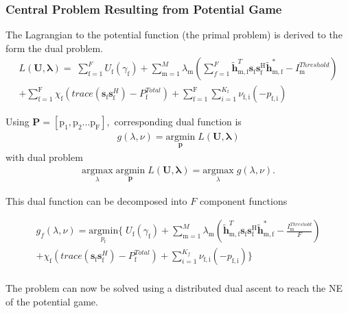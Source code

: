\documentclass[12pt,a4paper]{report}
\begin{document}
\subsubsection{Central Problem Resulting from Potential Game}
The Lagrangian to the potential function (the primal problem) is derived to the form the dual problem. 
\begin{multline}
L(\mathbf{U,\lambda}) = 
\;
\sum_{\text{f}=1}^F U_{\text{f}}(\gamma_{\text{f}}) 
+
\sum_{\mathrm{m=1}}^M \lambda_{\mathrm{m}}
(	  \sum^F_{f=1} \mathbf{\tilde{h}}_{\mathrm{m,f}}^T  \mathbf{s}_{\mathrm{f}} 						
	\mathbf{s_{\mathrm{f}}^{\mathrm{H}}} \mathbf{\tilde{h}_{\mathrm{m,f}}^*} - I^{Threshold}		
	_{\mathrm{m}} )
\\
+ 
\sum_{\text{f}=1}^\text{F}
\chi_{\mathrm{f}}(trace(\mathbf{s}_\mathrm{f}\mathbf{s}_\mathrm{f}^H)-P^{Total}_{\text{f}} )
+
\sum_{\text{f}=1}^\text{F}
\sum_{i=1}^{K_{\text{f}}}
\nu_{\mathrm{f,i}}(-p_{\mathrm{f,i}})
\end{multline}

Using $\mathbf{P}= [\mathrm{p}_1, \mathrm{p}_2...\mathrm{p}_{\text{F}}],$ corresponding dual function is
\begin{gather*}
g(\lambda,\nu) = \underset{\mathbf{p}}{\mathrm{argmin}}\;L(\mathbf{U,\lambda})
\end{gather*}
with dual problem 
\begin{gather*}
\underset{\lambda}{\mathrm{argmax}}\;\underset{\mathbf{p}}{\mathrm{argmin}}\;L(\mathbf{U,\lambda}) = \underset{\lambda}{\mathrm{argmax}}\;g(\lambda,\nu).
\end{gather*}

This dual function can be decomposed into $F$ component functions


\begin{multline}
g_f(\lambda,\nu) = \underset{p_{\text{f}}}{\mathrm{argmin}}
\{
\;
U_{\text{f}}(\gamma_{\text{f}}) 
+
\sum_{\mathrm{m=1}}^M \lambda_{\mathrm{m}}
(\mathbf{\tilde{h}}_{\mathrm{m,f}}^T  \mathbf{s}_{\mathrm{f}} 						
	\mathbf{s_{\mathrm{f}}^{\mathrm{H}}} \mathbf{\tilde{h}_{\mathrm{m,f}}^*} - \frac{I^{Threshold}_{\mathrm{m}}}{F})
\\
+ 
\chi_{\mathrm{f}}(trace(\mathbf{s}_\mathrm{f}\mathbf{s}_\mathrm{f}^H)-P^{Total}_{\text{f}} )
+
\sum_{i=1}^{K_f}
\nu_{\mathrm{f,i}}(-p_{\mathrm{f,i}})\}
\end{multline}
\\

The problem can now be solved using a distributed dual ascent to reach the NE of the potential game. 
\end{document}

